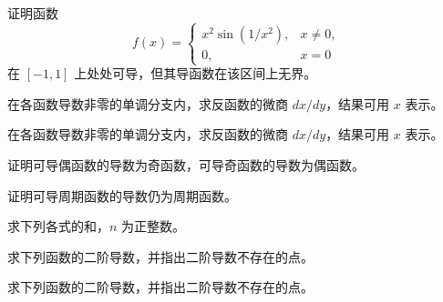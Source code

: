 \noindent\begin{minipage}{\textwidth}
证明函数\[f(x)=\begin{cases}x^2\sin(1/x^2),&x\ne0,\\0,&x=0\end{cases}\]在 $[-1,1]$ 上处处可导，但其导函数在该区间上无界。
\end{minipage}\par\vfill
\noindent\begin{minipage}{\textwidth}
在各函数导数非零的单调分支内，求反函数的微商 $dx/dy$，结果可用 $x$ 表示。
\end{minipage}\par\vfill
\noindent\begin{minipage}{\textwidth}
在各函数导数非零的单调分支内，求反函数的微商 $dx/dy$，结果可用 $x$ 表示。
\end{minipage}\par\vfill
\newpage
\noindent\begin{minipage}{\textwidth}
证明可导偶函数的导数为奇函数，可导奇函数的导数为偶函数。
\end{minipage}\par\vfill
\noindent\begin{minipage}{\textwidth}
证明可导周期函数的导数仍为周期函数。
\end{minipage}\par\vfill
\noindent\begin{minipage}{\textwidth}
求下列各式的和，$n$ 为正整数。
\end{minipage}\par\vfill
\noindent\begin{minipage}{\textwidth}
求下列函数的二阶导数，并指出二阶导数不存在的点。
\end{minipage}\par\vfill
\newpage
\noindent\begin{minipage}{\textwidth}
求下列函数的二阶导数，并指出二阶导数不存在的点。
\end{minipage}\par\vfill
